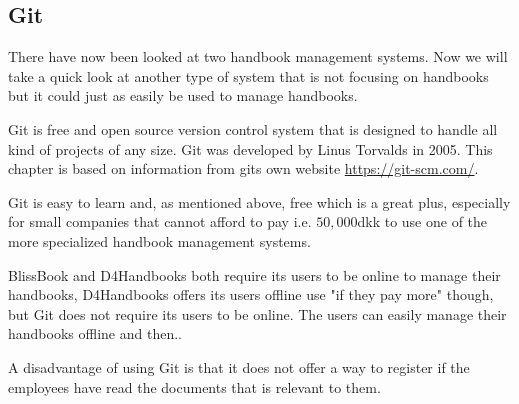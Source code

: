 \subsection{Git}
There have now been looked at two handbook management systems. Now we will take a quick look at another type of system that is not focusing on handbooks but it could just as easily be used to manage handbooks.

Git is free and open source version control system that is designed to handle all kind of projects of any size. Git was developed by Linus Torvalds in 2005. This chapter is based on information from gits own website \url{https://git-scm.com/}.

Git is easy to learn and, as mentioned above, free which is a great plus, especially for small companies that cannot afford to pay i.e. $50,000$dkk to use one of the more specialized handbook management systems. %

BlissBook and D4Handbooks both require its users to be online to manage their handbooks, D4Handbooks offers its users offline use "if they pay more" though, but Git does not require its users to be online. The users can easily manage their handbooks offline and then.. %

A disadvantage of using Git is that it does not offer a way to register if the employees have read the documents that is relevant to them.
